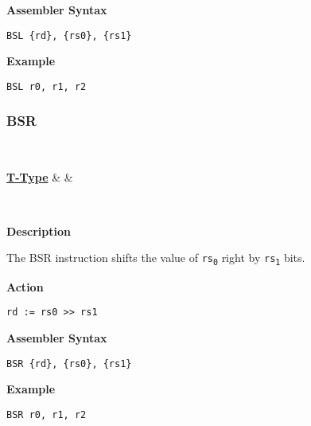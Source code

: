 \vspace{3ex}

\textbf{Assembler Syntax}
\begin{lstlisting}[frame=single]
	BSL {rd}, {rs0}, {rs1}
\end{lstlisting}

\vspace{3ex}

\textbf{Example}
\begin{lstlisting}[frame=single]
	BSL r0, r1, r2
\end{lstlisting}

\subsubsection{BSR }\label{sec:BSR}

\vspace{3ex}

\begin{center}
	\begin{bytefield}[leftcurly=., leftcurlyspace=0pt]{32}
		 \\
		\begin{leftwordgroup}{\hyperref[sec:t-type]{\textbf{T-Type}}}
			 & 
			 &
		\end{leftwordgroup}\\
	\end{bytefield}
\end{center}

\textbf{Description}

The BSR instruction shifts the value of \texttt{rs\textsubscript{0}} right by \texttt{rs\textsubscript{1}} bits.

\vspace{3ex}

\textbf{Action}
\begin{lstlisting}[frame=single]
	rd := rs0 >> rs1
\end{lstlisting}

\vspace{3ex}

\textbf{Assembler Syntax}
\begin{lstlisting}[frame=single]
	BSR {rd}, {rs0}, {rs1}
\end{lstlisting}

\vspace{3ex}

\textbf{Example}
\begin{lstlisting}[frame=single]
	BSR r0, r1, r2
\end{lstlisting}
